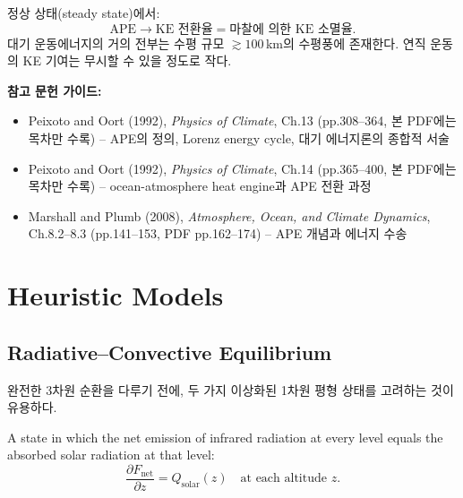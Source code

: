 \begin{hisublock}
  정상 상태(steady state)에서:
  $$\text{APE} \to \text{KE 전환율} = \text{마찰에 의한 KE 소멸율}.$$
  대기 운동에너지의 거의 전부는 수평 규모 $\gtrsim 100$\,km의 수평풍에 존재한다.
  연직 운동의 KE 기여는 무시할 수 있을 정도로 작다.
\end{hisublock}

\begin{hisublock}
\textbf{참고 문헌 가이드:}
\begin{itemize}
  \item Peixoto and Oort (1992), \textit{Physics of Climate}, Ch.13 (pp.308--364, 본 PDF에는 목차만 수록) -- APE의 정의, Lorenz energy cycle, 대기 에너지론의 종합적 서술
  \item Peixoto and Oort (1992), \textit{Physics of Climate}, Ch.14 (pp.365--400, 본 PDF에는 목차만 수록) -- ocean-atmosphere heat engine과 APE 전환 과정
  \item Marshall and Plumb (2008), \textit{Atmosphere, Ocean, and Climate Dynamics}, Ch.8.2--8.3 (pp.141--153, PDF pp.162--174) -- APE 개념과 에너지 수송
\end{itemize}
\end{hisublock}

\section{Heuristic Models}\label{sec:heuristic}

\subsection{Radiative--Convective Equilibrium}\label{subsec:rce}

완전한 3차원 순환을 다루기 전에, 두 가지 이상화된 1차원 평형 상태를
고려하는 것이 유용하다.

\begin{definition}\label{def:rad-eq}

  A state in which the net emission of infrared radiation at every level equals
  the absorbed solar radiation at that level:
  \begin{equation}
    \frac{\partial F_{\mathrm{net}}}{\partial z} = Q_{\mathrm{solar}}(z)
    \quad \text{at each altitude } z.
  \end{equation}
\end{definition}

